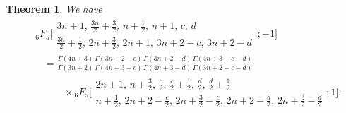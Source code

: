 \documentclass[12pt,reqno]{amsart}
\newtheorem{theorem}{Theorem}%
\begin{document}
\begin{theorem}
\label{th-cat}
We have
\begin{align}
&
\,{}_6F_5\biggl[\begin{matrix} 3n+1, \, \frac{3n}2+\frac32, \, n+\frac12, \, n+1, \, c, \, d \\[2pt]
\frac{3n}2+\frac12, \, 2n+\frac32, \, 2n+1, \, 3n+2-c, \, 3n+2-d \end{matrix}\,; -1\biggr]
\nonumber\\ &\quad
=\frac{\Gamma(4n+3)\,\Gamma(3n+2-c)\,\Gamma(3n+2-d)\,\Gamma(4n+3-c-d)}{\Gamma(3n+2)\,\Gamma(4n+3-c)\,\Gamma(4n+3-d)\,\Gamma(3n+2-c-d)}
\nonumber\\ &\quad\qquad\times
{}_6F_5\biggl[\begin{matrix} 2n+1, \, n+\frac32, \, \frac c2, \, \frac c2+\frac12, \, \frac d2, \, \frac d2+\frac12 \\[2pt]
n+\frac12, \, 2n+2-\frac c2, \, 2n+\frac32-\frac c2, \, 2n+2-\frac d2, \, 2n+\frac32-\frac d2 \end{matrix}; 1\biggr].
\label{id-cat}
\end{align}
\end{theorem}
\end{document}
